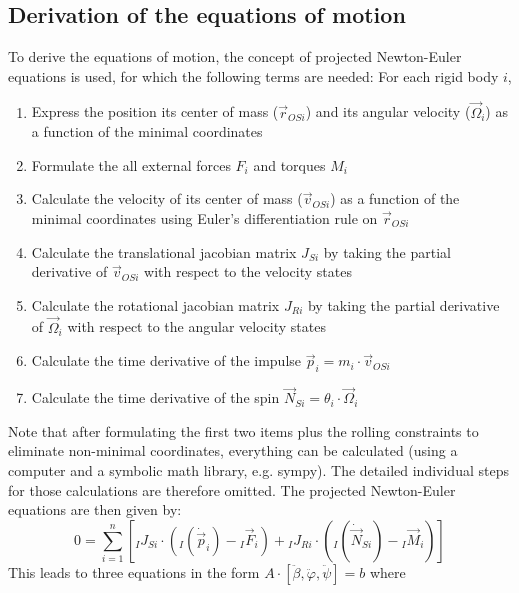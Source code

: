 \documentclass{article}
\begin{document}
\subsection{Derivation of the equations of motion}
To derive the equations of motion, the concept of projected Newton-Euler equations is used, for which the following terms are needed:
For each rigid body $i$,
\begin{enumerate}
	\item Express the position its center of mass ($\vec{r}_{OSi}$) and its angular velocity ($\vec{\Omega}_i$) as a function of the minimal coordinates
	\item Formulate the all external forces $F_i$ and torques $M_i$
	\item Calculate the velocity of its center of mass ($\vec{v}_{OSi}$) as a function of the minimal coordinates using Euler's differentiation rule on $\vec{r}_{OSi}$
	\item Calculate the translational jacobian matrix $J_{Si}$ by taking the partial derivative of $\vec{v}_{OSi}$ with respect to the velocity states
	\item Calculate the rotational jacobian matrix $J_{Ri}$ by taking the partial derivative of $\vec{\Omega}_i$ with respect to the angular velocity states
	\item Calculate the time derivative of the impulse $\vec{p}_{i} = m_i \cdot \vec{v}_{OSi}$
	\item Calculate the time derivative of the spin $\vec{N}_{Si} = \theta_i \cdot \vec{\Omega}_{i}$
\end{enumerate}
Note that after formulating the first two items plus the rolling constraints to eliminate non-minimal coordinates, everything can be calculated (using a computer and a symbolic math library, e.g. sympy). The detailed individual steps for those calculations are therefore omitted.
The projected Newton-Euler equations are then given by:
\begin{equation}
0 = \sum_{i=1}^n \left[{}_I J_{Si} \cdot \left( {}_I \left(\dot{\vec{p}}_i \right) - {}_I \vec{F}_i \right) + {}_I J_{Ri} \cdot \left( {}_I \left(\dot{\vec{N}}_{Si} \right) - {}_I \vec{M}_i \right) \right]
\end{equation}
This leads to three equations in the form $A \cdot [\ddot{\beta}, \ddot{\varphi}, \ddot{\psi}] = b$ where
\end{document}
